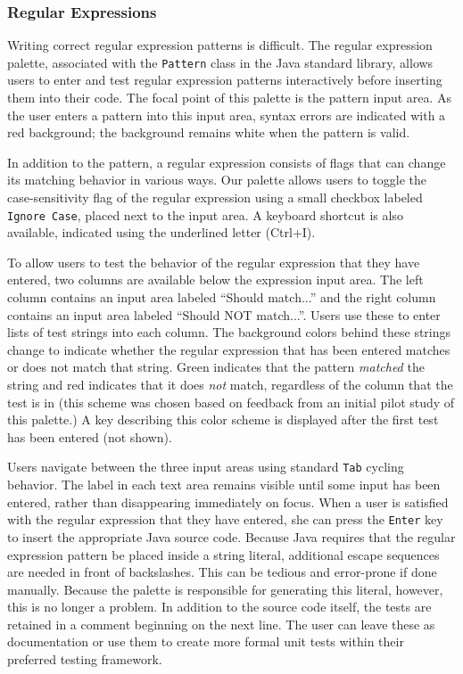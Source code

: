 \documentclass[10pt, conference, compsocconf]{IEEEtran}
\begin{document}
\subsubsection{Regular Expressions}
Writing correct regular expression patterns is difficult. The regular expression palette, associated with the \verb|Pattern| class in the Java standard library, allows users to enter and test regular expression patterns interactively before inserting them into their code.  The focal point of this palette is the pattern input area. As the user enters a pattern into this input area, syntax errors are indicated with a red background; the background remains white when the pattern is valid.

In addition to the pattern, a regular expression consists of flags that can change its matching behavior in various ways. Our palette allows users to toggle the case-sensitivity flag of the regular expression using a small checkbox labeled \verb|Ignore Case|, placed next to the input area. A keyboard shortcut is also available, indicated using the underlined letter (Ctrl+I). 

To allow users to test the behavior of the regular expression that they have entered, two columns are available below the expression input area. The left column contains an input area labeled ``Should match...'' and the right column contains an input area labeled ``Should NOT match...''. Users use these to enter lists of test  strings into each column. The background colors behind these strings change to indicate whether the regular expression that has been entered matches or does not match that string. Green indicates that the pattern  {\it matched} the string and red indicates that it does {\it not} match, regardless of the column that the test is in (this scheme was chosen based on feedback from an initial pilot study of this palette.) A key describing this color scheme is displayed after the first test has been entered (not shown).

Users navigate between the three input areas using standard \verb|Tab| cycling behavior. The label in each text area remains visible until some input has been entered, rather than disappearing immediately on focus. When a user is satisfied with the regular expression that they have entered, she can press the \verb|Enter| key to insert the appropriate Java source code. Because Java requires that the regular expression pattern be placed inside a string literal, additional escape sequences are needed in front of backslashes. This can be tedious and error-prone if done manually. Because the palette is responsible for generating this literal, however, this is no longer a problem. In addition to the source code itself, the tests are retained in a comment beginning on the next line. The user can leave these as documentation or use them to create more formal unit tests within their preferred testing framework.
\end{document}
